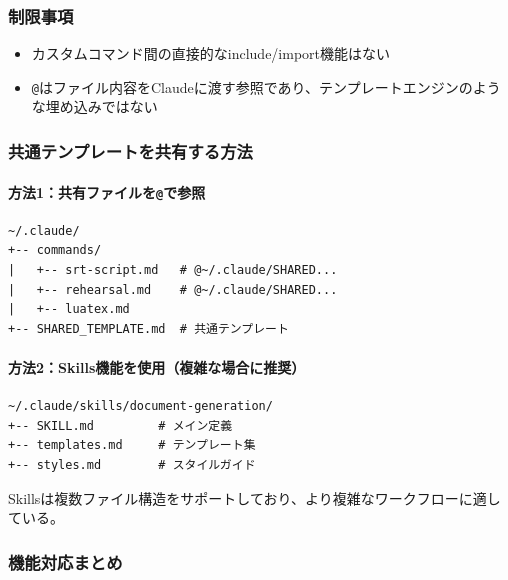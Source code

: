 \documentclass[a4paper,10pt,twocolumn]{ltjsarticle}
\begin{document}
\subsubsection{制限事項}

\begin{itemize}
  \item カスタムコマンド間の直接的なinclude/import機能はない
  \item \texttt{@}はファイル内容をClaudeに渡す参照であり、テンプレートエンジンのような埋め込みではない
\end{itemize}

\subsubsection{共通テンプレートを共有する方法}

\paragraph{方法1：共有ファイルを\texttt{@}で参照}

\begin{lstlisting}[language={}]
~/.claude/
+-- commands/
|   +-- srt-script.md   # @~/.claude/SHARED...
|   +-- rehearsal.md    # @~/.claude/SHARED...
|   +-- luatex.md
+-- SHARED_TEMPLATE.md  # 共通テンプレート
\end{lstlisting}

\paragraph{方法2：Skills機能を使用（複雑な場合に推奨）}

\begin{lstlisting}[language={}]
~/.claude/skills/document-generation/
+-- SKILL.md         # メイン定義
+-- templates.md     # テンプレート集
+-- styles.md        # スタイルガイド
\end{lstlisting}

Skillsは複数ファイル構造をサポートしており、より複雑なワークフローに適している。

\subsubsection{機能対応まとめ}

\vspace{0.5\baselineskip}
\vspace{0.5\baselineskip}
\end{document}
